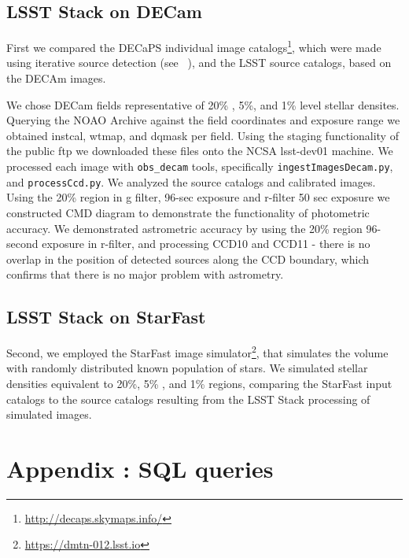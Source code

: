 \documentclass[DM,lsstdraft,toc,usenatbib]{lsstdoc}
\begin{document}
\subsection{LSST Stack on DECam}
 First we compared the DECaPS individual image catalogs\footnote{\url{http://decaps.skymaps.info/}}, which were made using iterative source detection (see ~\cite{schlafly2017}), and the LSST source catalogs, based on the  DECAm images.

We chose DECam fields representative of 20\% , 5\%, and 1\% level stellar densites. Querying the NOAO Archive against the field coordinates and  exposure range we obtained instcal,  wtmap, and dqmask per field. Using the staging functionality of the public ftp we downloaded these files onto the NCSA lsst-dev01 machine.  We processed each image with \verb|obs_decam| tools, specifically \verb|ingestImagesDecam.py|, and \verb|processCcd.py|. We analyzed the source catalogs and calibrated images. Using the 20\% region in g filter, 96-sec exposure and r-filter 50 sec exposure we constructed CMD diagram to demonstrate the functionality of photometric accuracy.  We demonstrated astrometric accuracy by using the 20\% region 96-second exposure in r-filter, and processing CCD10 and CCD11 - there is no overlap in the position of detected sources along the CCD boundary, which confirms that there is no major problem with astrometry. 



\subsection{LSST Stack on StarFast }
Second, we employed the StarFast image simulator\footnote{\url{https://dmtn-012.lsst.io}}, that simulates the volume with randomly distributed known population of stars. We simulated stellar densities equivalent to 20\%, 5\% , and 1\% regions, comparing the StarFast input catalogs to the source catalogs resulting from the LSST Stack processing of simulated images. 









\appendix
\section{Appendix : SQL queries}
\end{document}
